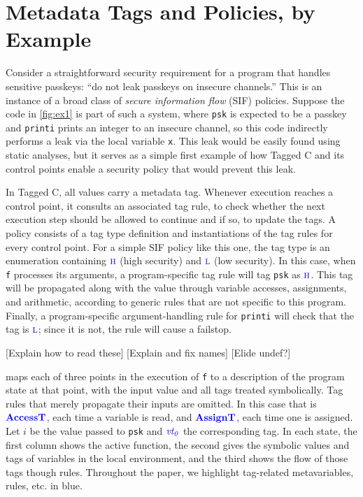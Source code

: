 \documentclass{llncs}
\begin{document}
\section{Metadata Tags and Policies, by Example}
\label{sec:example}

Consider a straightforward security requirement for a program that handles sensitive passkeys:
``do not leak passkeys on insecure channels.'' This is an instance of a broad class of
{\em secure information flow} (SIF) policies. Suppose the code in \cref{fig:ex1} is part of
such a system, where {\tt psk} is expected to be a passkey and {\tt printi}
prints an integer to an insecure channel, so this code indirectly performs a leak via the
local variable {\tt x}. This leak would be easily found using static analyses, but it serves
as a simple first example of how Tagged C and its control points
enable a security policy that would prevent this leak.

In Tagged C, all values carry a metadata tag. Whenever execution reaches a control point, it consults
an associated tag rule, to check whether the next execution step should be allowed to continue and
if so, to update the tags. A policy consists of a tag type definition and instantiations of the tag rules for every control point.
For a simple SIF policy like this one, the tag type is an enumeration containing \(\high\) (high security) and \(\low\) (low security).
In this case, when {\tt f} processes its arguments, a program-specific tag rule 
will tag {\tt psk} as \(\high\). This tag will be propagated along with the value through variable accesses,
assignments, and arithmetic, according to generic rules that are not specific to this program. Finally, a program-specific
argument-handling rule for {\tt printi} will check that the tag is \(\low\); since it is not, the rule will
cause a failstop.

[Explain how to read these]
[Explain and fix names]
[Elide undef?]

 maps each of three points in the execution of {\tt f} to a description of the program
state at that point, with the input value and all tags treated symbolically. 
Tag rules that merely propagate their inputs are omitted. In this case that is \(\accesstname\),
each time a variable is read, and \(\assigntname\), each time one is assigned.
Let \(i\) be the value passed to {\tt psk}
and \(\vt[_0]\) the corresponding tag. In each state, the first column
shows the active function, the second gives the symbolic values and tags
of variables in the local environment, and the third shows the flow of those tags though
rules. Throughout the paper, we highlight tag-related metavariables, rules, etc. in {\color{blue}blue}.
\end{document}
